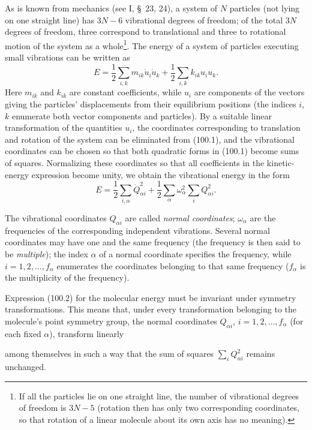As is known from mechanics (see I, \S~23, 24), a system of $N$ particles (not lying on one straight line) has $3N-6$ vibrational degrees of freedom; of the total $3N$ degrees of freedom, three correspond to translational and three to rotational motion of the system as a whole\footnote{If all the particles lie on one straight line, the number of vibrational degrees of freedom is $3N-5$ (rotation then has only two corresponding coordinates, so that rotation of a linear molecule about its own axis has no meaning).}. The energy of a system of particles executing small vibrations can be written as
\begin{equation}
 E=\frac12\sum_{i,k}m_{ik}\dot u_i\dot u_k+\frac12\sum_{i,k}k_{ik}u_i u_k. \tag{100.1}
\end{equation}
Here $m_{ik}$ and $k_{ik}$ are constant coefficients, while $u_i$ are components of the vectors giving the particles' displacements from their equilibrium positions (the indices $i$, $k$ enumerate both vector components and particles). By a suitable linear transformation of the quantities $u_i$, the coordinates corresponding to translation and rotation of the system can be eliminated from (100.1), and the vibrational coordinates can be chosen so that both quadratic forms in (100.1) become sums of squares. Normalizing these coordinates so that all coefficients in the kinetic-energy expression become unity, we obtain the vibrational energy in the form
\begin{equation}
 E=\frac12\sum_{i,\alpha}\dot Q_{\alpha i}^{2}+\frac12\sum_\alpha\omega_\alpha^2\sum_i Q_{\alpha i}^{2}. \tag{100.2}
\end{equation}

The vibrational coordinates $Q_{\alpha i}$ are called \emph{normal coordinates}; $\omega_\alpha$ are the frequencies of the corresponding independent vibrations. Several normal coordinates may have one and the same frequency (the frequency is then said to be \emph{multiple}); the index $\alpha$ of a normal coordinate specifies the frequency, while $i=1,2,\ldots,f_\alpha$ enumerates the coordinates belonging to that same frequency ($f_\alpha$ is the multiplicity of the frequency).

Expression (100.2) for the molecular energy must be invariant under symmetry transformations. This means that, under every transformation belonging to the molecule's point symmetry group, the normal coordinates $Q_{\alpha i}$, $i=1,2,\ldots,f_\alpha$ (for each fixed $\alpha$), transform linearly

among themselves in such a way that the sum of squares $\sum_iQ_{\alpha i}^2$ remains unchanged.

